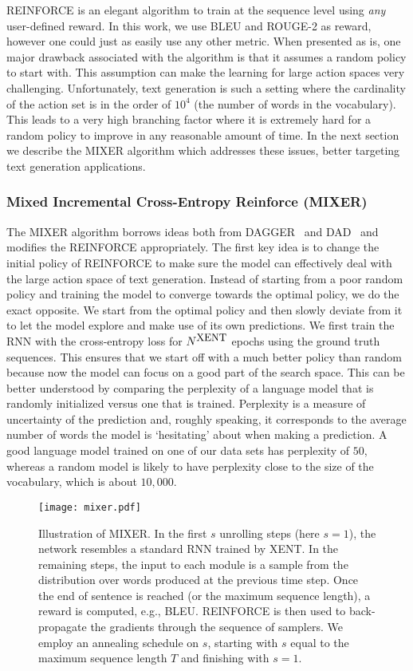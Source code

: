 \documentclass{article} \usepackage{iclr2016_conference,times}
\begin{document}
REINFORCE is an elegant algorithm to train at the sequence level using {\em any} user-defined reward. In this work, we use BLEU and ROUGE-2 as reward, however one could just as easily use any other metric.
When presented as is, one major drawback associated with the algorithm is that it assumes a random
policy to start with. This assumption can make the learning for large action spaces very challenging.
Unfortunately, text generation is such a setting where the cardinality of the action set is in the order of $10^4$ (the number of words in the vocabulary). 
This leads to a very high branching factor where it is extremely hard for a random policy to improve in any reasonable amount of time. 
In the next section we describe the MIXER algorithm which addresses these issues, better targeting
text generation applications.

\subsubsection{Mixed Incremental Cross-Entropy Reinforce (MIXER)} \label{model-mixer}
The MIXER algorithm borrows ideas both from DAGGER~\citep{dagger} and 
DAD~\citep{dad, sbengio-nips2015} and modifies the REINFORCE appropriately. 
The first key idea is to change the initial policy of REINFORCE to make sure
the model can effectively deal with the large action space of text generation.
Instead of starting from a poor random policy and training the model to converge 
towards the optimal policy, we do the exact opposite. We start from the optimal 
policy and then slowly deviate from it to let the model explore and make use 
of its own predictions.
We first train the RNN with the cross-entropy loss for
$N^{\mbox{\small{XENT}}}$ epochs using the ground truth sequences.
This ensures that we start off with a much better policy than random 
because now the model can focus on a good part of the search space.
This can be better understood by comparing the perplexity of a language model 
that is randomly initialized versus one that is trained. Perplexity is a measure of uncertainty of the prediction and, roughly speaking, it corresponds to the average number of words the model is `hesitating' about when making a prediction. A good language model trained on one of our data sets has perplexity of $50$, whereas a random model is likely to have
perplexity close to the size of the vocabulary, which is about $10,000$.
\begin{figure}[!t]
\begin{center}
\texttt{[image: mixer.pdf]}
\end{center}
\caption{Illustration of MIXER. In the first $s$ unrolling steps (here $s=1$),
  the network resembles a standard RNN trained by XENT. In the
  remaining steps, the input to each module is a sample from the
  distribution over words produced at the previous time step. Once the
  end of sentence is reached (or the maximum sequence length), a
  reward is computed, e.g., BLEU. REINFORCE is then
  used to back-propagate the gradients through the sequence of
  samplers. We employ an annealing schedule on $s$, starting with 
  $s$ equal to the maximum sequence length $T$ and finishing with $s = 1$.
 }
\label{fig:mixer}
\end{figure}
\end{document}
